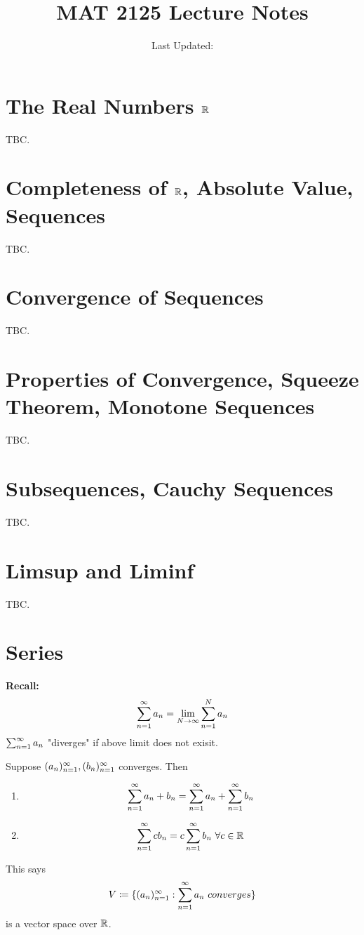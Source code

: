 \documentclass[openany]{report}
\title{MAT 2125 Lecture Notes}
\author{Last Updated:}
\begin{document}
\maketitle

\tableofcontents

\chapter{The Real Numbers $\mathbb{R}$}
TBC.
\chapter{Completeness of $\mathbb{R}$, Absolute Value, Sequences }
TBC.
\chapter{Convergence of Sequences}
TBC. 
\chapter{Properties of Convergence, Squeeze Theorem, Monotone Sequences}
TBC. 
\chapter{Subsequences, Cauchy Sequences}
TBC.
\chapter{Limsup and Liminf}
TBC.

\chapter{Series}
\textbf{Recall:}
\[\sum_{n=1}^\infty a_n = \lim_{N\rightarrow \infty} \sum_{n=1}^N a_n\]
$\sum_{n=1}^\infty a_n$ "diverges" if above limit does not exisit.
\begin{prop}
    Suppose $({a}_n)_{n=1}^\infty, ({b}_n)_{n=1}^\infty$ converges. Then
    \begin{enumerate}[label=(\roman*)]
        \item 
        \[\sum_{n=1}^\infty a_n + b_n = \sum_{n=1}^\infty a_n + \sum_{n=1}^\infty b_n\]
        \item
        \[\sum_{n=1}^\infty cb_n = c\sum_{n=1}^\infty b_n \ \forall c \in \mathbb{R}\]
    \end{enumerate}
    This says 
    \[V \coloneqq \{({a}_n)_{n=1}^\infty: \sum_{n=1}^\infty a_n \ converges\}\]
    is a vector space over $\mathbb{R}$.
\end{prop}
\end{document}
